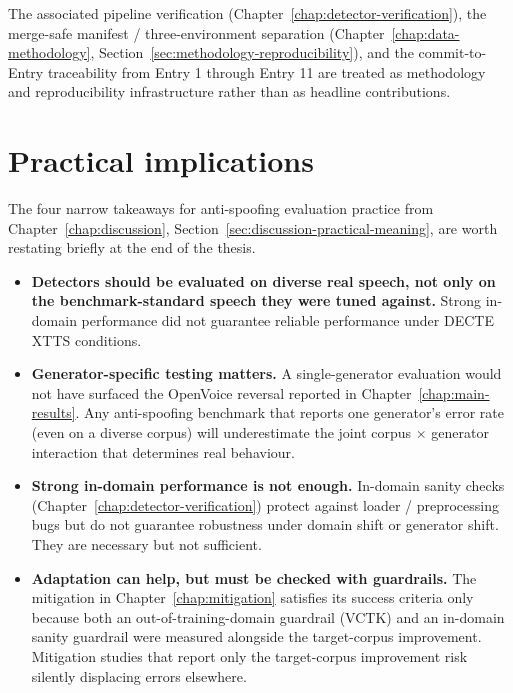 The associated pipeline verification (Chapter~\ref{chap:detector-verification}), the
merge-safe manifest / three-environment separation
(Chapter~\ref{chap:data-methodology}, Section~\ref{sec:methodology-reproducibility}), and the commit-to-Entry
traceability from Entry 1 through Entry 11 are treated as
methodology and reproducibility infrastructure rather than as
headline contributions.


\section{Practical implications}
\label{sec:conclusion-practical-implications}

The four narrow takeaways for anti-spoofing evaluation practice
from Chapter~\ref{chap:discussion}, Section~\ref{sec:discussion-practical-meaning}, are worth restating briefly at
the end of the thesis.

\begin{itemize}
    \item \textbf{Detectors should be evaluated on diverse real speech, not
        only on the benchmark-standard speech they were tuned
        against.} Strong in-domain performance did not guarantee
        reliable performance under DECTE XTTS conditions.
    \item \textbf{Generator-specific testing matters.} A single-generator
        evaluation would not have surfaced the OpenVoice reversal
        reported in Chapter~\ref{chap:main-results}. Any anti-spoofing benchmark that
        reports one generator's error rate (even on a diverse
        corpus) will underestimate the joint corpus $\times$ generator
        interaction that determines real behaviour.
    \item \textbf{Strong in-domain performance is not enough.} In-domain
        sanity checks (Chapter~\ref{chap:detector-verification}) protect against loader / preprocessing
        bugs but do not guarantee robustness under domain shift or
        generator shift. They are necessary but not sufficient.
    \item \textbf{Adaptation can help, but must be checked with guardrails.}
        The mitigation in Chapter~\ref{chap:mitigation} satisfies its success criteria only
        because both an out-of-training-domain guardrail (VCTK) and an
        in-domain sanity guardrail were measured alongside the
        target-corpus improvement. Mitigation studies that report only
        the target-corpus improvement risk silently displacing errors
        elsewhere.
\end{itemize}

